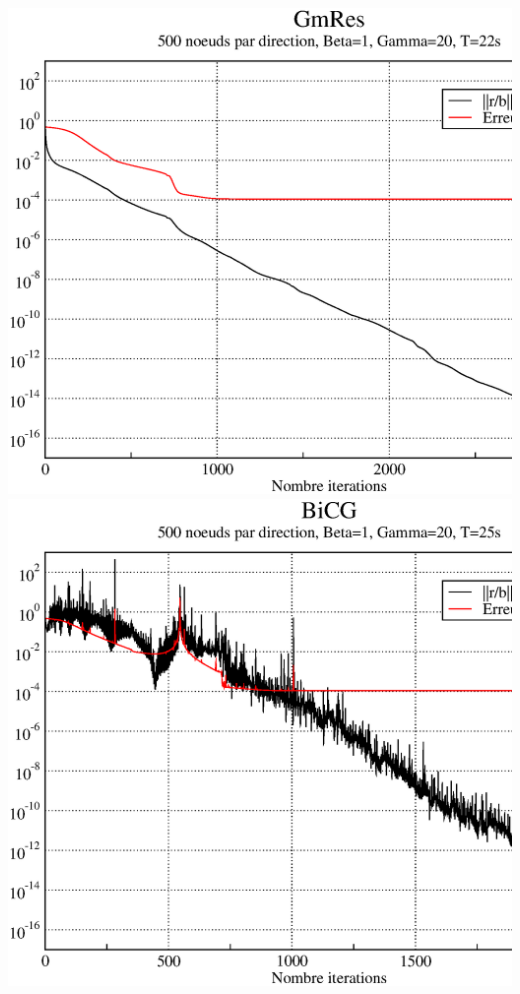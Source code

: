 \documentclass[twoside,12pt]{report}
\theoremstyle{remark}
\begin{document}
\begin{center}
\includegraphics[scale=0.36]{image/gmres_500_1_20.eps}
\includegraphics[scale=0.36]{image/bicg_500_1_20.eps}
\end{center}
\end{document}
